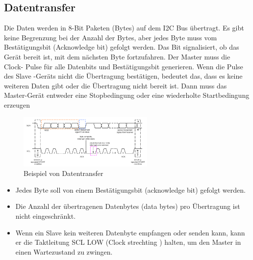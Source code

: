 \documentclass[conference]{IEEEtran}
\begin{document}
\subsection{Datentransfer}
Die Daten werden in 8-Bit Paketen (Bytes) auf dem I2C Bus übertragt.  Es gibt keine Begrenzung bei der Anzahl der Bytes, aber jedes Byte muss vom Bestätigungsbit (Acknowledge bit) gefolgt werden. Das Bit signalisiert, ob das Gerät bereit ist, mit dem nächsten Byte fortzufahren. Der Master muss die Clock- Pulse für alle Datenbits und Bestätigungsbit generieren. Wenn die Pulse des Slave -Geräts nicht die Übertragung bestätigen, bedeutet das, dass es keine weiteren Daten gibt oder die Übertragung nicht bereit ist. Dann muss das Master-Gerät entweder eine Stopbedingung oder eine wiederholte Startbedingung erzeugen
\begin{figure}
	\centering
	\includegraphics[width=0.7\linewidth]{fig7}
	\caption{Beispiel von Datentransfer}
	\label{fig:fig7}
\end{figure}

\begin{itemize}
	\item Jedes Byte soll von einem Bestätigungsbit (acknowledge bit) gefolgt werden.
		\item 	Die Anzahl der übertragenen Datenbytes (data bytes) pro Übertragung ist nicht eingeschränkt. 
		\item 	Wenn ein Slave kein weiteren Datenbyte empfangen oder senden kann, kann er die Taktleitung SCL LOW (Clock strechting ) halten, um den Master in einen Wartezustand zu zwingen. 
\end{itemize}
\end{document}

